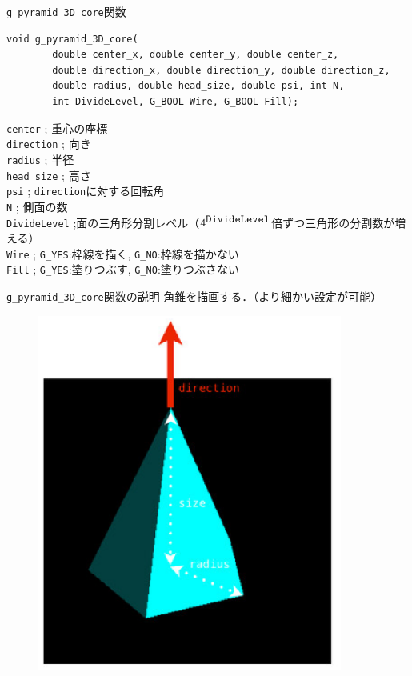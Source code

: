 \documentclass[platex,a4paper,12pt]{jsarticle}%
\begin{document}
\begin{itembox}[l]{\texttt{g\_pyramid\_3D\_core}関数}
\begin{verbatim}
void g_pyramid_3D_core(
        double center_x, double center_y, double center_z,
        double direction_x, double direction_y, double direction_z,
        double radius, double head_size, double psi, int N,
        int DivideLevel, G_BOOL Wire, G_BOOL Fill);
\end{verbatim}
\verb|center| ; 重心の座標\\
\verb|direction| ; 向き\\
\verb|radius| ; 半径\\
\verb|head_size| ; 高さ\\
\verb|psi| ; \verb|direction|に対する回転角\\
\verb|N| ; 側面の数\\
\verb|DivideLevel| ;面の三角形分割レベル（$4^{\verb|DivideLevel|}$倍ずつ三角形の分割数が増える）\\
\verb|Wire| ; \verb|G_YES|:枠線を描く, \verb|G_NO|:枠線を描かない \\
\verb|Fill| ; \verb|G_YES|:塗りつぶす, \verb|G_NO|:塗りつぶさない 
\end{itembox}

\begin{itembox}[l]{\texttt{g\_pyramid\_3D\_core}関数の説明}
角錐を描画する．（より細かい設定が可能）
\end{itembox}

\begin{figure}[htb]
\centering
	\includegraphics[width=100mm]{Canvas_g_pyramid.eps}
\end{figure}
\end{document}
